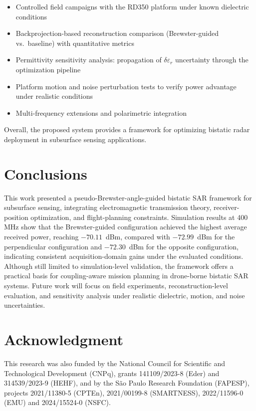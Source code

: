 \documentclass[conference]{IEEEtran}
\begin{document}
\begin{itemize}
\item Controlled field campaigns with the RD350 platform under known dielectric conditions
\item Backprojection-based reconstruction comparison (Brewster-guided vs.\ baseline) with quantitative metrics
\item Permittivity sensitivity analysis: propagation of $\delta\varepsilon_r$ uncertainty through the optimization pipeline
\item Platform motion and noise perturbation tests to verify power advantage under realistic conditions
\item Multi-frequency extensions and polarimetric integration
\end{itemize}

Overall, the proposed system provides a framework for optimizing bistatic radar deployment in subsurface sensing applications.
\section{Conclusions}

This work presented a pseudo-Brewster-angle-guided bistatic SAR framework for subsurface sensing, integrating electromagnetic transmission theory, receiver-position optimization, and flight-planning constraints. Simulation results at 400 MHz show that the Brewster-guided configuration achieved the highest average received power, reaching $-70.11$~dBm, compared with $-72.99$~dBm for the perpendicular configuration and $-72.30$~dBm for the opposite configuration, indicating consistent acquisition-domain gains under the evaluated conditions. Although still limited to simulation-level validation, the framework offers a practical basis for coupling-aware mission planning in drone-borne bistatic SAR systems. Future work will focus on field experiments, reconstruction-level evaluation, and sensitivity analysis under realistic dielectric, motion, and noise uncertainties.

\section *{Acknowledgment}
This research was also funded by the National Council for Scientific and Technological Development (CNPq), grants 141109/2023-8 (Eder) and 314539/2023-9 (HEHF), and by the São Paulo Research Foundation (FAPESP), projects 2021/11380-5 (CPTEn), 2021/00199-8 (SMARTNESS),
2022/11596-0 (EMU) and 2024/15524-0 (NSFC).
\end{document}
